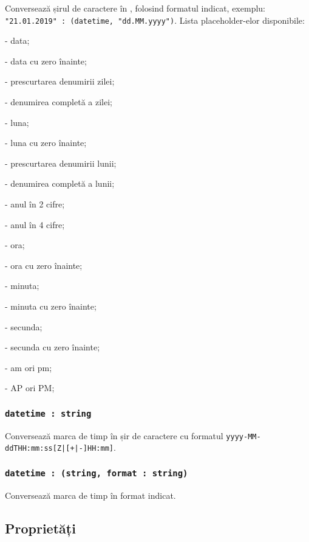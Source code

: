 Conversează șirul de caractere  în , folosind formatul indicat, exemplu: \lstinline|"21.01.2019" : (datetime, "dd.MM.yyyy")|. Lista placeholder-elor disponibile:
\begin{icItems}
	\item {} - data;
	\item {} - data cu zero înainte;
	\item {} - prescurtarea denumirii zilei;
	\item {} - denumirea completă a zilei;
	\item {} - luna;
	\item {} - luna cu zero înainte;
	\item {} - prescurtarea denumirii lunii;
	\item {} - denumirea completă a lunii;
	\item {} - anul în 2 cifre;
	\item {} - anul în 4 cifre;
	\item {} - ora;
	\item {} - ora cu zero înainte;
	\item {} - minuta;
	\item {} - minuta cu zero înainte;
	\item {} - secunda;
	\item {} - secunda cu zero înainte;
	\item {} - am ori pm;
	\item {} - AP ori PM;
\end{icItems}

\subsubsection{\lstinline|datetime : string|}

Conversează marca de timp în șir de caractere cu formatul \lstinline`yyyy-MM-ddTHH:mm:ss[Z|[+|-]HH:mm]`.

\subsubsection{\lstinline|datetime : (string, format : string)|}

Conversează marca de timp în format indicat.

\subsection{Proprietăți}

